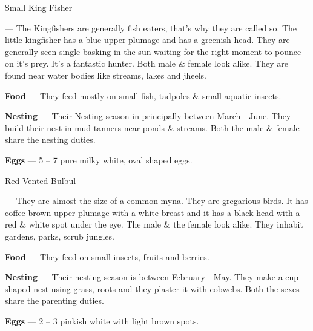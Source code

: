\begin{bird}{Small King Fisher}

 --- The Kingfishers are generally fish eaters, that's why they are called so. The little kingfisher has a blue upper plumage and has a greenish head. They are generally seen single basking in the sun waiting for the right moment to pounce on it's prey. It's a fantastic hunter. Both male \& female look alike. They are found near water bodies like streams, lakes and jheels.

{\large\bf Food} --- They feed mostly on small fish, tadpoles \& small aquatic insects.

{\large\bf Nesting} --- Their Nesting season in principally between March - June. They build their nest in mud tanners near ponds \& streams. Both the male \& female share the nesting duties.

{\large\bf Eggs} --- 5 -- 7 pure milky white, oval shaped eggs.
\end{bird}

\begin{bird}{Red Vented Bulbul}

 --- They are almost the size of a common myna. They are gregarious birds. It has coffee brown upper plumage with a white breast and it has a black head with a red \& white spot under the eye. The male \& the female look alike. They inhabit gardens, parks, scrub jungles.

{\large\bf Food} --- They feed on small insects, fruits and berries.

{\large\bf Nesting} --- Their nesting season is between February - May. They make a cup shaped nest using grass, roots and they plaster it with cobwebs. Both the sexes share the parenting duties.

{\large\bf Eggs} --- 2 -- 3 pinkish white with light brown spots.
\end{bird}

